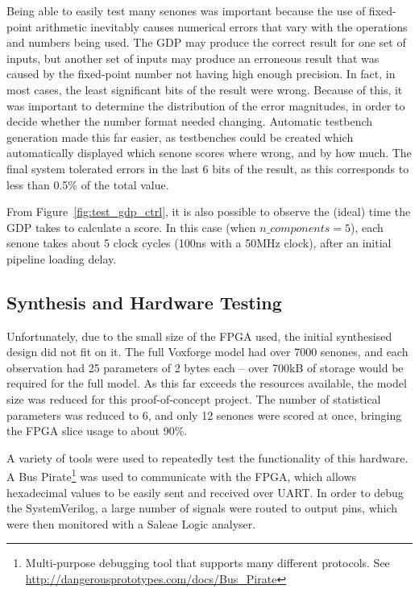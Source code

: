 	Being able to easily test many senones was important because the use of fixed-point arithmetic inevitably causes numerical errors that vary with the operations and numbers being used.  The GDP may produce the correct result for one set of inputs, but another set of inputs may produce an erroneous result that was caused by the fixed-point number not having high enough precision.  In fact, in most cases, the least significant bits of the result were wrong.  Because of this, it was important to determine the distribution of the error magnitudes, in order to decide whether the number format needed changing.  Automatic testbench generation made this far easier, as testbenches could be created which automatically displayed which senone scores where wrong, and by how much.  The final system tolerated errors in the last 6 bits of the result, as this corresponds to less than 0.5\% of the total value.


	From Figure~\ref{fig:test_gdp_ctrl}, it is also possible to observe the (ideal) time the GDP takes to calculate a score.  In this case (when $n\_components=5$), each senone takes about 5 clock cycles (100ns with a 50MHz clock), after an initial pipeline loading delay.

	\subsection{Synthesis and Hardware Testing} %
	\label{sub:gdp_synthesis_and_hardware_testing}
		Unfortunately, due to the small size of the FPGA used, the initial synthesised design did not fit on it.  The full Voxforge model had over 7000 senones, and each observation had 25 parameters of 2 bytes each -- over 700kB of storage would be required for the full model.  As this far exceeds the resources available, the model size was reduced for this proof-of-concept project.  The number of statistical parameters was reduced to 6, and only 12 senones were scored at once, bringing the FPGA slice usage to about 90\%.  %

		A variety of tools were used to repeatedly test the functionality of this hardware.  A Bus Pirate\footnote{Multi-purpose debugging tool that supports many different protocols.  See \href{http://dangerousprototypes.com/docs/Bus_Pirate}{http://dangerousprototypes.com/docs/Bus\_Pirate}} was used to communicate with the FPGA, which allows hexadecimal values to be easily sent and received over UART.  In order to debug the SystemVerilog, a large number of signals were routed to output pins, which were then monitored with a Saleae Logic analyser.


